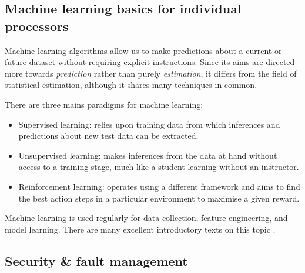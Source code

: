 \documentclass[twocolumn, aps, rmp, amsmath, amssymb, nofootinbib, superscriptaddress, longbibliography, floatfix, table-of-contents, eqsecnum]{revtex4}
\begin{document}
\subsection{Machine learning basics for individual processors}

Machine learning algorithms allow us to make predictions about a current or future dataset without requiring explicit instructions. Since its aims are directed more towards \textit{prediction} rather than purely \textit{estimation}, it differs from the field of statistical estimation, although it shares many techniques in common.

There are three mains paradigms for machine learning:
\begin{itemize}
	\item Supervised learning: relies upon training data from which inferences and predictions about new test data can be extracted.
	\item Unsupervised learning: makes inferences from the data at hand without access to a training stage, much like a student learning without an instructor.
	\item Reinforcement learning: operates using a different framework and aims to find the best action steps in a particular environment to maximise a given reward.
\end{itemize}

Machine learning is used regularly for data collection, feature engineering, and model learning. There are many excellent introductory texts on this topic \cite{bib:bishop2006pattern, bib:shalev2014understanding, bib:trevor2009elements, bib:marsland2011machine, bib:flach2012machine}.


\subsection{Security \& fault management}
\end{document}
